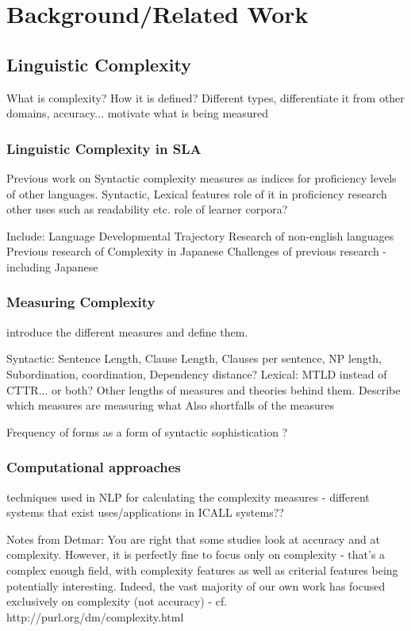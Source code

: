 \chapter{Background/Related Work}

\section{Linguistic Complexity}
What is complexity? How it is defined? Different types, differentiate it from other domains, accuracy...
motivate what is being measured


\subsection{Linguistic Complexity in SLA}
Previous work on Syntactic complexity measures as indices for proficiency levels of other languages.
Syntactic, Lexical features
role of it in proficiency research
other uses such as readability etc.
role of learner corpora?

Include:
Language Developmental Trajectory
Research of non-english languages
Previous research of Complexity in Japanese
Challenges of previous research - including Japanese


\subsection{Measuring Complexity}
introduce the different measures and define them.

Syntactic:
Sentence Length, Clause Length, Clauses per sentence, NP length, Subordination, coordination, Dependency distance?
Lexical:
MTLD instead of CTTR... or both?
Other lengths of measures and theories behind them. Describe which measures are measuring what Also shortfalls of the
measures


Frequency of forms as a form of syntactic sophistication ? \cite{Ellis2004}
%

\subsection{Computational approaches}
techniques used in NLP for calculating the complexity measures - different systems that exist
uses/applications in ICALL systems??




Notes from Detmar:
You are right that some studies look at accuracy and at
complexity. However, it is perfectly fine to focus only on complexity
- that's a complex enough field, with complexity features as well as
criterial features being potentially interesting. Indeed, the vast
majority of our own work has focused exclusively on complexity (not
accuracy) - cf. http://purl.org/dm/complexity.html

